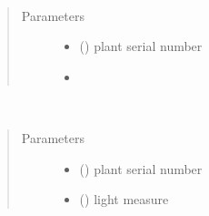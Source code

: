 \documentclass[letterpaper,10pt,english]{sphinxmanual}
\begin{document}

\begin{fulllineitems}
\label{\detokenize{index:controller.utility.update_ideal_temp}}~\begin{quote}\begin{description}
\item[{Parameters}] \leavevmode\begin{itemize}
\item {} 
 () \textendash{} plant serial number

\item {} 
 \textendash{} 

\end{itemize}

\end{description}\end{quote}

\end{fulllineitems}


\begin{fulllineitems}
\label{\detokenize{index:controller.utility.update_light}}~\begin{quote}\begin{description}
\item[{Parameters}] \leavevmode\begin{itemize}
\item {} 
 () \textendash{} plant serial number

\item {} 
 () \textendash{} light measure

\end{itemize}

\end{description}\end{quote}

\end{fulllineitems}
\end{document}
